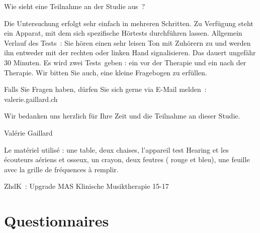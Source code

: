 Wie sieht eine Teilnahme an der Studie aus ?

Die Untersuchung erfolgt sehr einfach in mehreren Schritten.
Zu Verfügung steht ein Apparat, mit dem sich spezifische Hörtests durchführen lassen.
Allgemein Verlauf des Tests :  
Sie hören einen sehr leisen Ton mit Zuhörern zu und werden ihn entweder mit der rechten  oder linken Hand  signalisieren. Das dauert ungefähr 30 Minuten.
Es wird zwei Tests geben : ein vor der Therapie und ein nach der Therapie.
Wir bitten Sie auch, eine kleine Fragebogen zu erfüllen.


Falls Sie Fragen haben, dürfen Sie sich gerne via E-Mail melden : valerie.gaillard\@gmx.ch

Wir bedanken uns herzlich für Ihre Zeit und die Teilnahme an dieser Studie.


Valérie Gaillard

 Le matériel utilisé : une table, deux chaises, l'appareil
test Hearing et les écouteurs aériens et osseux, un crayon, deux
feutres ( rouge et bleu), une feuille avec la grille de fréquences à
remplir.

ZhdK : Upgrade MAS Klinische Musiktherapie 15-17

\chapter{Questionnaires}



%
%
%
%
%
